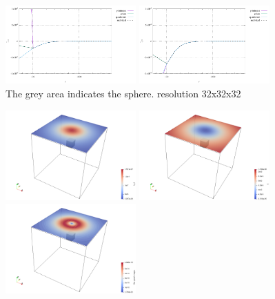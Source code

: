 \begin{center}
\includegraphics[width=5cm]{python_codes/fieldstone_84/cube/tensor_xz}
\includegraphics[width=5cm]{python_codes/fieldstone_84/cube/tensor_yz}\\
{\captionfont  The grey area indicates the sphere. resolution  32x32x32}
\end{center}



\begin{center}
\includegraphics[width=5cm]{python_codes/fieldstone_84/cube/g}
\includegraphics[width=5cm]{python_codes/fieldstone_84/cube/U}
\includegraphics[width=5cm]{python_codes/fieldstone_84/cube/horgrad}
\end{center}

